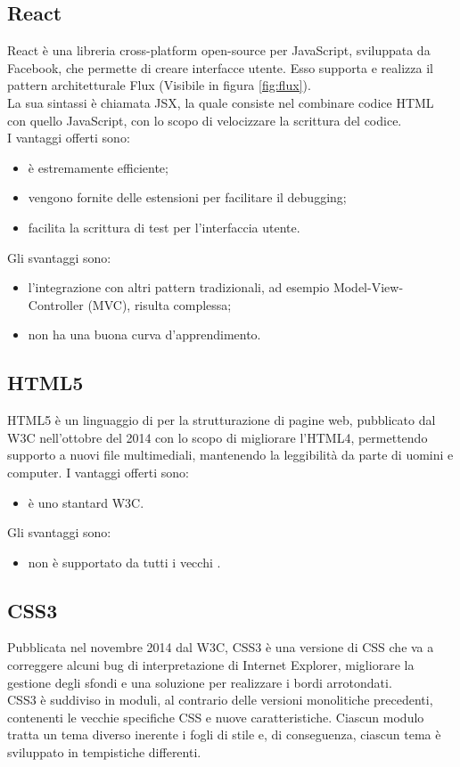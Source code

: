 \subsection{React}
React è una libreria cross-platform open-source per JavaScript, sviluppata da Facebook, che permette di creare interfacce utente. Esso supporta e realizza il pattern architetturale Flux (Visibile in figura \ref{fig:flux}). \\
La sua sintassi è chiamata JSX, la quale consiste nel combinare codice HTML con quello JavaScript, con lo scopo di velocizzare la scrittura del codice.\\
I vantaggi offerti sono:
\begin{itemize}
	\item è estremamente efficiente;
	\item vengono fornite delle estensioni per facilitare il debugging;
	\item facilita la scrittura di test per l'interfaccia utente.
\end{itemize}
Gli svantaggi sono:
\begin{itemize}
	\item l'integrazione con altri pattern tradizionali, ad esempio Model-View-Controller (MVC), risulta complessa;
	\item non ha una buona curva d'apprendimento.
\end{itemize}
\subsection{HTML5}
HTML5 è un linguaggio di  per la strutturazione di pagine web, pubblicato dal W3C nell’ottobre del 2014 con lo scopo di migliorare l’HTML4, permettendo supporto a nuovi file multimediali, mantenendo la leggibilità da parte di uomini e computer.
I vantaggi offerti sono:
\begin{itemize}
	\item è uno stantard W3C.
\end{itemize}
Gli svantaggi sono:
\begin{itemize}
	\item non è supportato da tutti i vecchi .
\end{itemize}
\subsection{CSS3}
Pubblicata nel novembre 2014 dal W3C, CSS3 è una versione di CSS che va a correggere alcuni bug di interpretazione di Internet Explorer, migliorare la gestione degli sfondi e una soluzione per realizzare i bordi arrotondati.\\
CSS3 è suddiviso in moduli, al contrario delle versioni monolitiche precedenti, contenenti le vecchie specifiche CSS e nuove caratteristiche. Ciascun modulo tratta un tema diverso inerente i fogli di stile e, di conseguenza, ciascun tema è sviluppato in tempistiche differenti.

